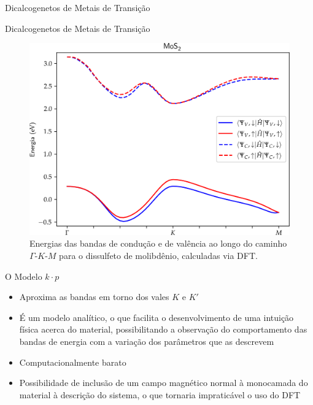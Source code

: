 \begin{frame}{Dicalcogenetos de Metais de Transição}
  
\end{frame}

\begin{frame}{Dicalcogenetos de Metais de Transição}
  \begin{figure}
    \centering
    \includegraphics[height=0.68\textheight]{imagens/mos2_bands.png}
    \caption{
      Energias das bandas de condução e de valência ao longo do caminho
      $\Gamma$-$K$-$M$ para o dissulfeto de molibdênio, calculadas via DFT.
    }
    \label{fig:mos2_bands}
  \end{figure}
\end{frame}

\begin{frame}{O Modelo $k \cdot p$}
  \begin{itemize}
    \item Aproxima as bandas em torno dos vales $K$ e $K'$
    \item É um modelo analítico, o que facilita o desenvolvimento de uma
          intuição física acerca do material, possibilitando a observação do
          comportamento das bandas de energia com a variação dos parâmetros que
          as descrevem
    \item Computacionalmente barato
    \item Possibilidade de inclusão de um campo magnético normal à monocamada do
          material à descrição do sistema, o que tornaria impraticável o uso do DFT
  \end{itemize}
\end{frame}

